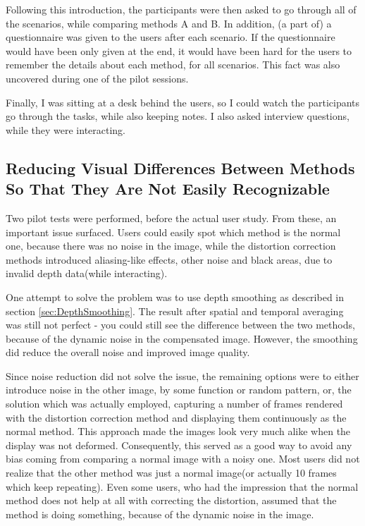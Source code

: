 \documentclass[]{article}
\begin{document}
Following this introduction, the participants were then asked to go through all of the scenarios, while comparing methods A and B. In addition, (a part of) a  questionnaire was given to the users after each scenario. If the questionnaire would have been only given at the end, it would have been hard for the users to remember the details about each method, for all scenarios. This fact was also uncovered during one of the pilot sessions.

Finally, I was sitting at a desk behind the users, so I could watch the participants go through the tasks, while also keeping notes. I also asked interview questions, while they were interacting.  

\subsection{Reducing Visual Differences Between Methods So That They Are Not Easily Recognizable}

Two pilot tests were performed, before the actual user study. From these, an important issue surfaced. Users could easily spot which method is the normal one, because there was no noise in the image, while the distortion correction methods introduced aliasing-like effects, other noise and black areas, due to invalid depth data(while interacting). 

One attempt to solve the problem was to use depth smoothing as described in section \ref{sec:DepthSmoothing}. The result after spatial and temporal averaging was still not perfect - you could still see the difference between the two methods, because of the dynamic noise in the compensated image. However, the smoothing did reduce the overall noise and improved image quality. 

Since noise reduction did not solve the issue, the remaining options were to either introduce noise in the other image, by some function or random pattern, or, the solution which was actually employed, capturing a number of frames rendered with the distortion correction method and displaying them continuously as the normal method. This approach made the images look very much alike when the display was not deformed. Consequently, this served as a good way to avoid any bias coming from comparing a normal image with a noisy one. Most users did not realize that the other method was just a normal image(or actually 10 frames which keep repeating). Even some users, who had the impression that the normal method does not help at all with correcting the distortion, assumed that the method is doing something, because of the dynamic noise in the image.
\end{document}
